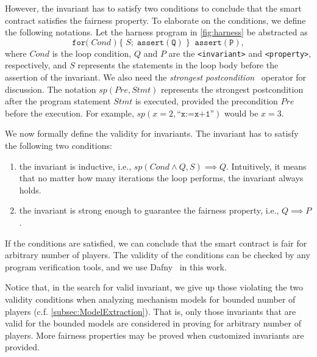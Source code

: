 However, the invariant has to satisfy two conditions to conclude that the smart contract satisfies
the fairness property.
To elaborate on the conditions, we define the following notations.
Let the harness program in \cref{fig:harness} be abstracted as%
\[\mathtt{for(} \; Cond \; \mathtt{)} \; \{ \; S ; \; \mathtt{assert(Q)} \; \} \;\;
\mathtt{assert(P)},\]%
where $Cond$ is the loop condition, $Q$ and $P$ are the \texttt{<invariant>} and
\texttt{<property>}, respectively, and $S$ represents the statements in the loop body before the
assertion of the invariant.
We also need the \emph{strongest postcondition}~\cite{DS90} operator for discussion.
The notation $sp(Pre, Stmt)$ represents the strongest postcondition after the program statement
$Stmt$ is executed, provided the precondition $Pre$ before the execution.
For example, $sp(x=2, \texttt{``x:=x+1''})$ would be $x=3$.

We now formally define the validity for invariants.
The invariant has to satisfy the following two conditions:
\begin{enumerate}
	\item the invariant is inductive, i.e., $sp(Cond \wedge Q, S) \implies Q$.
	Intuitively, it means that no matter how many iterations the loop performs, the invariant
	always holds.
	\item the invariant is strong enough to guarantee the fairness property, i.e., $Q \implies P$.
\end{enumerate}

If the conditions are satisfied, we can conclude that the smart contract is fair for arbitrary
number of players.
The validity of the conditions can be checked by any program verification tools, and we use
Dafny~\cite{dafny} in this work.


Notice that, in the search for valid invariant, we give up those violating the two validity
conditions when analyzing mechanism models for bounded number of players (c.f.
\cref{subsec:ModelExtraction}).
That is, only those invariants that are valid for the bounded models are considered in proving for
arbitrary number of players.
More fairness properties may be proved when customized invariants are provided.



